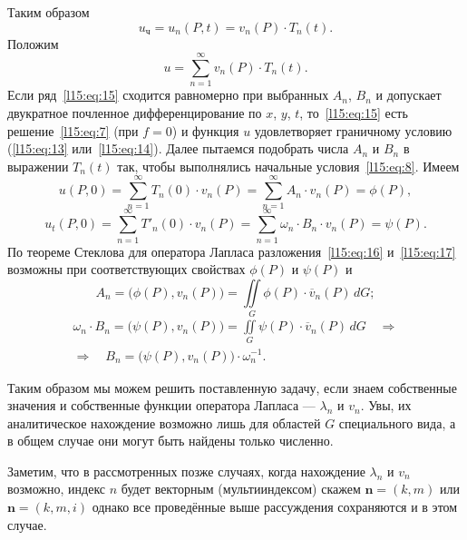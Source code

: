 Таким образом
\begin{equation*}
	 u_{\text{ч}}=u_{n}(P,t)=v_{n}(P)\cdot T_{n}(t).
\end{equation*}
Положим 
\begin{equation}\label{l15:eq:15}
	 u=\sum\limits_{n=1}^{\infty}v_n(P)\cdot T_n(t).
\end{equation}
Если ряд~\eqref{l15:eq:15} сходится равномерно при выбранных $A_n$, $B_n$ и допускает двукратное почленное дифференцирование по $x$, $y$, $t$, то~\eqref{l15:eq:15} есть решение~\eqref{l15:eq:7} (при $f=0$) и функция $u$ удовлетворяет граничному условию (\eqref{l15:eq:13} или~\eqref{l15:eq:14}). Далее пытаемся подобрать числа $A_n$ и $B_n$ в выражении $T_n(t)$ так, чтобы выполнялись начальные условия~\eqref{l15:eq:8}. Имеем
\begin{equation}\label{l15:eq:16}
	u(P,0)=\sum\limits_{n=1}^{\infty}T_n(0)\cdot v_n(P)=\sum\limits_{n=1}^{\infty}A_n\cdot v_n(P)=\phi(P),
\end{equation}
\begin{equation}\label{l15:eq:17}
	u_t(P,0)=\sum\limits_{n=1}^{\infty}T'_n(0)\cdot v_n(P)=\sum\limits_{n=1}^{\infty}\omega_n\cdot B_n\cdot v_n(P)=\psi(P).
\end{equation}
По теореме Стеклова для оператора Лапласа разложения~\eqref{l15:eq:16} и~\eqref{l15:eq:17} возможны при соответствующих свойствах $\phi(P)$ и $\psi(P)$ и
\begin{equation*}
	A_n=\big(\phi(P),v_n(P)\big)=\iint\limits_{G}\phi(P)\cdot\overline{v}_n(P)\,dG;
\end{equation*}
\begin{multline*}
\omega_n\cdot B_n=\big(\psi(P),v_n(P)\big)=\iint\limits_{G}\psi(P)\cdot\overline{v}_n(P)\,dG\quad\Rightarrow\\ \Rightarrow\quad B_n=\big(\psi(P),v_n(P)\big)\cdot\omega_n^{-1}.
\end{multline*}

Таким образом мы можем решить поставленную задачу, если знаем собственные значения и собственные функции оператора Лапласа --- $\lambda_n$ и $v_n$. Увы, их аналитическое нахождение возможно лишь для областей $G$ специального вида, а в общем случае они могут быть найдены только численно.

Заметим, что в рассмотренных позже случаях, когда нахождение $\lambda_n$ и $v_n$ возможно, индекс $n$ будет векторным (мультииндексом) скажем $\bm{n}=(k,m)$ или $\bm{n}=(k,m,i)$ однако все проведённые выше рассуждения сохраняются и в этом случае.
